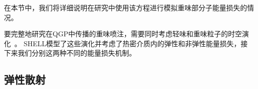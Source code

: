   在本节中，我们将详细说明在研究中使用该方程进行模拟重味部分子能量损失的情况。

  要完整地研究在QGP中传播的重味喷注，需要同时考虑轻味和重味粒子的时空演化~\parencite{Sharma:2009hn,Rapp:2018qla,Djordjevic:2013xoa,Kang:2016ofv}。
  SHELL模型了这些演化并考虑了热密介质内的弹性和非弹性能量损失，接下来我们分别这两种不同的能量损失机制。

 

\subsection{弹性散射} 

